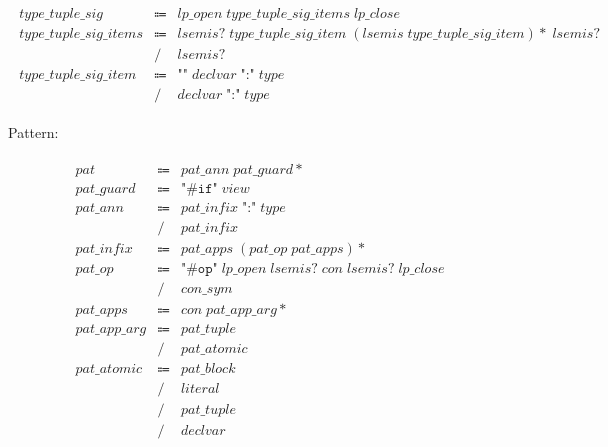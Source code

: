 \begin{align*}
    \begin{array}{rcll}
        \mathit{type\_tuple\_sig}
        &\Coloneq &\mathit{lp\_open}\; \mathit{type\_tuple\_sig\_items}\; \mathit{lp\_close} \\
        \mathit{type\_tuple\_sig\_items}
        &\Coloneq &\mathit{lsemis}{?}\; \mathit{type\_tuple\_sig\_item}\; (\mathit{lsemis}\; \mathit{type\_tuple\_sig\_item}){*}\; \mathit{lsemis}{?} \\
        &\mathrel{/} &\mathit{lsemis}{?} \\
        \mathit{type\_tuple\_sig\_item}
        &\Coloneq &\texttt{"\^{}"}\; \mathit{declvar}\; \texttt{":"}\; \mathit{type} \\
        &\mathrel{/} &\mathit{declvar}\; \texttt{":"}\; \mathit{type}
    \end{array}
\end{align*}

Pattern:

\begin{align*}
    \begin{array}{rcll}
        \mathit{pat}
        &\Coloneq &\mathit{pat\_ann}\; \mathit{pat\_guard}{*} \\
        \mathit{pat\_guard}
        &\Coloneq &\texttt{"\#if"}\; \mathit{view} \\
        \mathit{pat\_ann}
        &\Coloneq &\mathit{pat\_infix}\; \texttt{":"}\; \mathit{type} \\
        &\mathrel{/} &\mathit{pat\_infix} \\
        \mathit{pat\_infix}
        &\Coloneq &\mathit{pat\_apps}\; (\mathit{pat\_op}\; \mathit{pat\_apps}){*} \\
        \mathit{pat\_op}
        &\Coloneq &\texttt{"\#op"}\; \mathit{lp\_open}\; \mathit{lsemis}{?}\; \mathit{con}\; \mathit{lsemis}{?}\; \mathit{lp\_close} \\
        &\mathrel{/} &\mathit{con\_sym} \\
        \mathit{pat\_apps}
        &\Coloneq &\mathit{con}\; \mathit{pat\_app\_arg}{*} \\
        \mathit{pat\_app\_arg}
        &\Coloneq &\mathit{pat\_tuple} \\
        &\mathrel{/} &\mathit{pat\_atomic} \\
        \mathit{pat\_atomic}
        &\Coloneq &\mathit{pat\_block} \\
        &\mathrel{/} &\mathit{literal} \\
        &\mathrel{/} &\mathit{pat\_tuple} \\
        &\mathrel{/} &\mathit{declvar}
    \end{array}
\end{align*}

